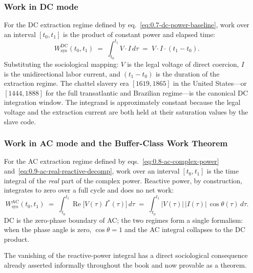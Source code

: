 \subsubsection*{Work in DC mode}

For the DC extraction regime defined by
eq.~\eqref{eq:0.7-dc-power-baseline}, work over an interval
$[t_0, t_1]$ is the product of constant power and elapsed time:
\begin{equation}\label{eq:0.13-systemic-work-dc}
W_{\text{sys}}^{\text{DC}}(t_0, t_1) \;=\; \int_{t_0}^{t_1} V \cdot I \, d\tau \;=\; V \cdot I \cdot (t_1 - t_0).
\end{equation}
Substituting the sociological mapping: $V$ is the legal voltage of
direct coercion, $I$ is the unidirectional labor current, and
$(t_1 - t_0)$ is the duration of the extraction regime. The chattel
slavery era $[1619, 1865]$ in the United States---or
$[1444, 1888]$ for the full transatlantic and Brazilian regime---is
the canonical DC integration window. The integrand is approximately
constant because the legal voltage and the extraction current are
both held at their saturation values by the slave code.

\subsubsection*{Work in AC mode and the Buffer-Class Work Theorem}

For the AC extraction regime defined by
eqs.~\eqref{eq:0.8-ac-complex-power} and~\eqref{eq:0.9-ac-real-reactive-decomp},
work over an interval $[t_0, t_1]$ is the time integral of the
\emph{real} part of the complex power. Reactive power, by construction,
integrates to zero over a full cycle and does no net work:
\begin{equation}\label{eq:0.14-systemic-work-ac}
W_{\text{sys}}^{\text{AC}}(t_0, t_1) \;=\; \int_{t_0}^{t_1} \operatorname{Re}\!\bigl[V(\tau)\, I^{*}(\tau)\bigr]\, d\tau \;=\; \int_{t_0}^{t_1} |V(\tau)|\,|I(\tau)|\,\cos\theta(\tau)\, d\tau.
\end{equation}
DC is the zero-phase boundary of AC; the two regimes form a single formalism: when the phase angle is zero, $\cos\theta = 1$ and the AC integral
collapses to the DC product.

The vanishing of the reactive-power integral has a direct sociological
consequence already asserted informally throughout the book and now
provable as a theorem.

